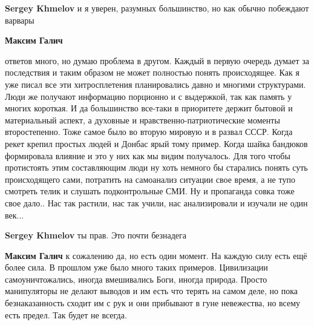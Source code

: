 \textbf{Sergey Khmelov} и я уверен, разумных большинство, но как обычно побеждают варвары

 
\textbf{Максим Галич} 

ответов много, но думаю проблема в другом. Каждый в
первую очередь думает за последствия и таким образом не может полностью понять
происходящее. Как я уже писал все эти хитросплетения планировались давно и
многими структурами. Люди же получают информацию порционно и с выдержкой, так
как память у многих короткая. И да большинство все-таки в приоритете держит
бытовой и материальный аспект, а духовные и нравственно-патриотические моменты
второстепенно. Тоже самое было во вторую мировую и в развал СССР. Когда рекет
крепил простых людей и Донбас ярый тому пример. Когда шайка бандюков
формировала влияние и это у них как мы видим получалось. Для того чтобы
протистоять этим составляющим люди ну хоть немного бы старались понять суть
происходящего сами, потратить на самоанализ ситуации свое время, а не тупо
смотреть телик и слушать подконтрольные СМИ. Ну и пропаганда совка тоже свое
дало.. Нас так растили, нас так учили, нас анализировали и изучали не один
век...

 
\textbf{Sergey Khmelov} ты прав. Это почти безнадега

 
\textbf{Максим Галич} к сожалению да, но есть один момент. На каждую силу есть ещё более сила. В прошлом уже было много таких примеров. Цивилизации самоуничтожались, иногда вмешивались Боги, иногда природа. Просто манипуляторы не делают выводов и им есть что терять на самом деле, но пока безнаказанность сходит им с рук и они прибывают в гуне невежества, но всему есть предел. Так будет не всегда.

